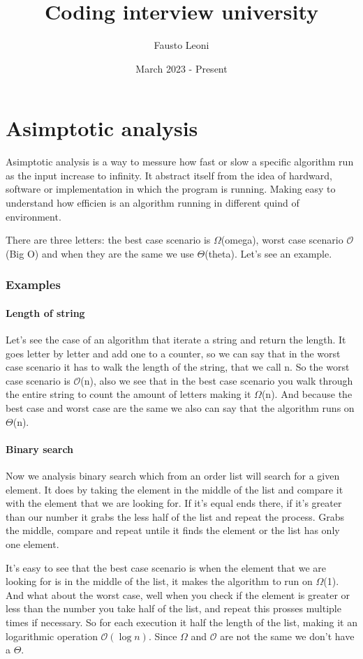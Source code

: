 \documentclass{report}
\title{\Huge{Coding interview university}}
\author{\huge{Fausto Leoni}}
\date{March 2023 - Present}
\begin{document}
\maketitle
\newpage%
\tableofcontents
\pagebreak

\chapter{Asimptotic analysis}

Asimptotic analysis is a way to messure how fast or slow a specific algorithm run as the input increase to infinity. It abstract itself from the idea of hardward, software or implementation in which the program is running. Making easy to understand how efficien is an algorithm running in different quind of environment. 

There are three letters: the best case scenario is $\Omega$(omega), worst case scenario $\mathcal{O}$(Big O) and when they are the same we use $\Theta$(theta). Let's see an example.

\subsection*{Examples}
\subsubsection{Length of string}
Let's see the case of an algorithm that iterate a string and return the length. It goes letter by letter and add one to a counter, so we can say that in the worst case scenario it has to walk the length of the string, that we call n. So the worst case scenario is $\mathcal{O}$(n), also we see that in the best case scenario you walk through the entire string to count the amount of letters making it $\Omega$(n). And because the best case and worst case are the same we also can say that the algorithm runs on $\Theta$(n).

\subsubsection{Binary search}
Now we analysis binary search which from an order list will search for a given element. It does by taking the element in the middle of the list and compare it with the element that we are looking for. If it's equal ends there, if it's greater than our number it grabs the less half of the list and repeat the process. Grabs the middle, compare and repeat untile it finds the element or the list has only one element.

It's easy to see that the best case scenario is when the element that we are looking for is in the middle of the list, it makes the algorithm to run on $\Omega$(1). And what about the worst case, well when you check if the element is greater or less than the number you take half of the list, and repeat this prosses multiple times if necessary. So for each execution it half the length of the list, making it an logarithmic operation $\mathcal{O} (\log{}{n})$. Since $\Omega$ and $\mathcal{O}$ are not the same we don't have a $\Theta$.
\end{document}

